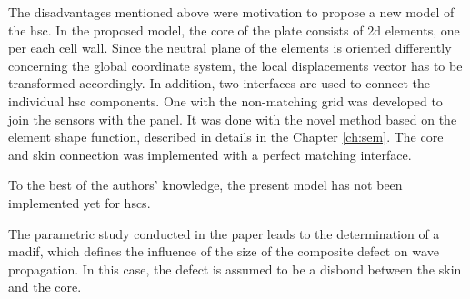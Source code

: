 The disadvantages mentioned above were motivation to propose a new model of the \ac{hsc}.
In the proposed model, the core of the plate consists of \ac{2d} elements, one per each cell wall.
Since the neutral plane of the elements is oriented differently concerning the global coordinate system, the local displacements vector has to be transformed accordingly.
In addition, two interfaces are used to connect the individual \ac{hsc} components.
One with the non-matching grid was developed to join the sensors with the panel.
It was done with the novel method based on the element shape function, described in details in the Chapter \ref{ch:sem}.
The core and skin connection was implemented with a perfect matching interface.

To the best of the authors’ knowledge, the present model has not been implemented yet for \acp{hsc}.

The parametric study conducted in the paper leads to the determination of a \ac{madif}, which defines the influence of the size of the composite defect on wave propagation.
In this case, the defect is assumed to be a disbond between the skin and the core.